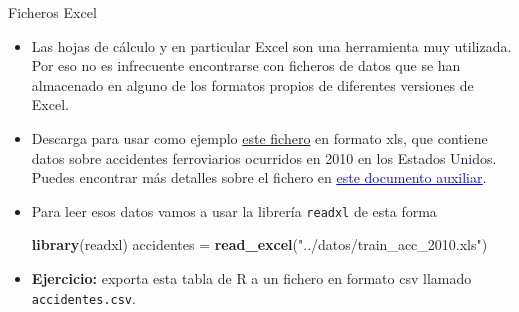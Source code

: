\documentclass[
  9pt,
  ignorenonframetext,
]{beamer}
\newenvironment{Shaded}{\begin{snugshade}}{\end{snugshade}}
\newcommand{\KeywordTok}[1]{\textcolor[rgb]{0.13,0.29,0.53}{\textbf{#1}}}
\newcommand{\NormalTok}[1]{#1}
\newcommand{\StringTok}[1]{\textcolor[rgb]{0.31,0.60,0.02}{#1}}
\begin{document}
\begin{frame}[fragile]{Ficheros Excel}
\protect\hypertarget{ficheros-excel}{}

\begin{itemize}
\item
  Las hojas de cálculo y en particular Excel son una herramienta muy
  utilizada. Por eso no es infrecuente encontrarse con ficheros de datos
  que se han almacenado en alguno de los formatos propios de diferentes
  versiones de Excel.
\item
  Descarga para usar como ejemplo
  \href{http://users.stat.ufl.edu/~winner/data/train_acc_2010.xls}{este
  fichero} en formato xls, que contiene datos sobre accidentes
  ferroviarios ocurridos en 2010 en los Estados Unidos. Puedes encontrar
  más detalles sobre el fichero en
  \href{http://users.stat.ufl.edu/~winner/data/train_acc_2010.txt}{\textcolor{blue}{\underline{este documento auxiliar}}}.
\item
  Para leer esos datos vamos a usar la librería \texttt{readxl} de esta
  forma

\begin{Shaded}
\begin{Highlighting}[]
\KeywordTok{library}\NormalTok{(readxl)}
\NormalTok{accidentes =}\StringTok{ }\KeywordTok{read_excel}\NormalTok{(}\StringTok{"../datos/train_acc_2010.xls"}\NormalTok{)}
\end{Highlighting}
\end{Shaded}
\item
  \textbf{Ejercicio:} exporta esta tabla de R a un fichero en formato
  csv llamado \texttt{accidentes.csv}.
\end{itemize}

\end{frame}
\end{document}
